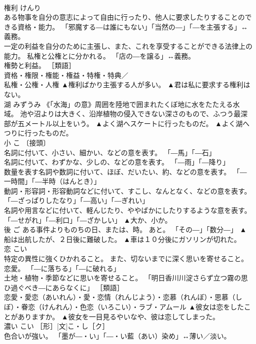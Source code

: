 \documentclass[8pt]{extreport}
\begin{document}
\begin{CJK}{UTF8}{min}
\\	権利	けんり	
\\	ある物事を自分の意志によって自由に行ったり、他人に要求したりすることのできる資格・能力。 「邪魔する―は誰にもない」「当然の―」「―を主張する」↔義務。 
\\	一定の利益を自分のために主張し、また、これを享受することができる法律上の能力。 私権と公権とに分かれる。 「店の―を譲る」↔義務。 
\\	権勢と利益。 ［類語］
\\	資格・権限・権能・権益・特権・特典／
\\	私権・公権・人権	▲権利ばかり主張する人が多い。 ▲君は私に要求する権利はない。
\\	湖	みずうみ	《「水海」の意》周囲を陸地で囲まれたくぼ地に水をたたえる水域。 池や沼よりは大きく、沿岸植物の侵入できない深さのもので、ふつう最深部が五メートル以上をいう。	▲よく湖へスケートに行ったものだ。 ▲よく湖へつりに行ったものだ。
\\	小	こ	〔接頭〕 
\\	名詞に付いて、小さい、細かい、などの意を表す。 「―馬」「―石」 
\\	名詞に付いて、わずかな、少しの、などの意を表す。 「―雨」「―降り」 
\\	数量を表す名詞や数詞に付いて、ほぼ、だいたい、約、などの意を表す。 「―一時間」「―半時（はんとき）」 
\\	動詞・形容詞・形容動詞などに付いて、すこし、なんとなく、などの意を表す。 「―ざっぱりしたなり」「―高い」「―ぎれい」 
\\	名詞や用言などに付いて、軽んじたり、ややばかにしたりするような意を表す。 「―せがれ」「―利口」「―ざかしい」	▲大か、小か。
\\	後	ご	ある事件よりものちの日、または、時。 あと。 「その―」「数分―」	▲船は出航したが、２日後に難破した。 ▲車は１０分後にガソリンが切れた。
\\	恋	こい	
\\	特定の異性に強くひかれること。 また、切ないまでに深く思いを寄せること。 恋愛。 「―に落ちる」「―に破れる」 
\\	土地・植物・季節などに思いを寄せること。 「明日香川川淀さらず立つ霧の思ひ過ぐべき―にあらなくに」 ［類語］
\\	恋愛・愛恋（あいれん）・愛・恋情（れんじよう）・恋慕（れんぼ）・思慕（しぼ）・眷恋（けんれん）・色恋（いろこい）・ラブ・アムール	▲彼女は恋をしたことがありますか。 ▲彼女を一目見るやいなや、彼は恋してしまった。
\\	濃い	こい	［形］[文]こ・し［ク］ 
\\	色合いが強い。 「墨が―・い」「―・い藍（あい）染め」↔薄い／淡い。 

\end{CJK}
\end{document}
